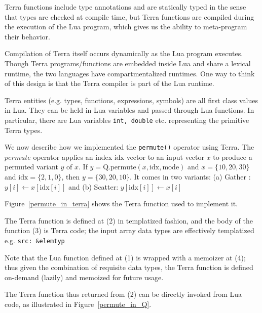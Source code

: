 \item Terra functions include type annotations and are statically typed in the sense that types are checked at compile time, but Terra functions are compiled during the execution of the Lua program, which gives us the ability to meta-program their behavior.

\item Compilation of Terra itself occurs dynamically as the Lua program executes. Though Terra programs/functions are embedded inside Lua and share a lexical runtime, the two languages have compartmentalized runtimes. One way to think of this design is that the Terra compiler
is part of the Lua runtime.

\item Terra entities (e.g. types, functions, expressions, symbols) are all first class values in Lua.
They can be held in Lua variables and passed through Lua functions. In particular, there are Lua variables {\tt int, double} etc. representing the primitive Terra types.

\ee

We now describe how we implemented the {\tt permute()} operator using Terra.
The \(permute\) operator applies an index \(\mathrm{idx}\) vector to an input vector \(x\)
to produce a permuted variant \(y\) of \(x\). 
If \(y = \mathrm{Q.permute}(x, \mathrm{idx}, \mathrm{mode})\) and \(x = \{10, 20, 30\}\) and
\(\mathrm{idx} = \{2, 1,
0\}\), then \(y = \{30, 20, 10\}\).
It comes in two variants:
(a) 
Gather : \(y[i] \leftarrow x[\mathrm{idx}[i]]\) and (b) 
Scatter: \(y[\mathrm{idx}[i]] \leftarrow x[i]\) 

\begin{figure}
\centering
{}
\end{figure}

Figure~\ref{permute_in_terra} shows the Terra function used to implement it.
\bi
\item The Terra function is defined at (2) in templatized fashion, and the body of the function (3) is Terra code; the input array data types are effectively templatized e.g. {\tt src: \&elemtyp}
\item Note that the Lua function defined at (1) is wrapped with a memoizer at (4); thus given the combination of requisite data types, the Terra function is defined on-demand (lazily) and memoized for future usage.
\item The Terra function thus returned from (2) can be directly invoked from Lua code, as illustrated in Figure~\ref{permute_in_Q}.
\ei

